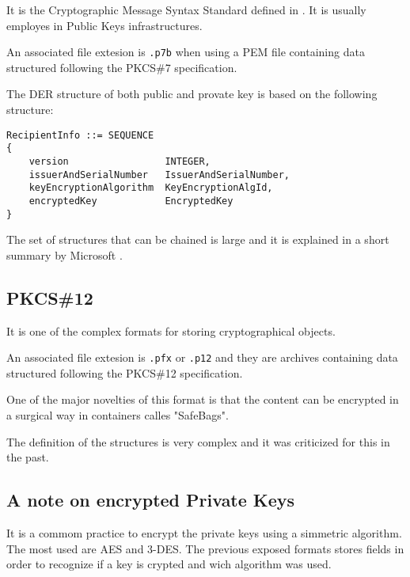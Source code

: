 \documentclass[11pt]{article}
\begin{document}
It is the Cryptographic Message Syntax Standard defined in \cite{rfc2315}.
It is usually employes in Public Keys infrastructures.

An associated file extesion is \verb|.p7b| when using a PEM file containing data structured following the PKCS\#7 specification.

The DER structure of both public and provate key is based on the following structure:

\begin{verbatim}
RecipientInfo ::= SEQUENCE 
{
    version                 INTEGER,
    issuerAndSerialNumber   IssuerAndSerialNumber,
    keyEncryptionAlgorithm  KeyEncryptionAlgId,
    encryptedKey            EncryptedKey
} 
\end{verbatim}

The set of structures that can be chained is large and it is explained in a short summary by Microsoft \cite{mspkcs7}.

\subsection{PKCS\#12}

It is one of the complex formats for storing cryptographical objects.

An associated file extesion is \verb|.pfx| or \verb|.p12| and they are archives containing data structured following the PKCS\#12 specification.

One of the major novelties of this format is that the content can be encrypted in a surgical way in containers calles "SafeBags".

The definition of the structures \cite{pkcs12_struct} is very complex and it was criticized for this in the past.

\subsection{A note on encrypted Private Keys}

It is a commom practice to encrypt the private keys using a simmetric algorithm.
The most used are AES and 3-DES.
The previous exposed formats stores fields in order to recognize if a key is crypted and wich algorithm was used.


\vfill
\end{document}

